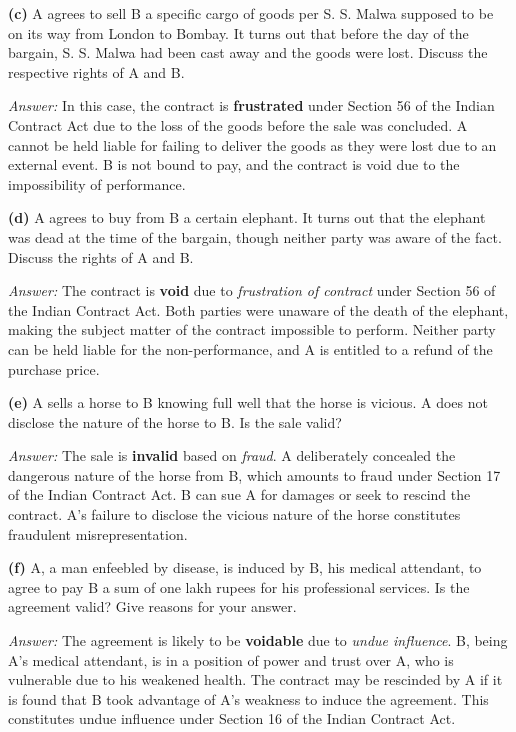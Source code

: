 \documentclass[12pt,a4paper]{book}
\begin{document}
\textbf{(c)} A agrees to sell B a specific cargo of goods per S. S. Malwa supposed to be on its way from London to Bombay. It turns out that before the day of the bargain, S. S. Malwa had been cast away and the goods were lost. Discuss the respective rights of A and B. 

\textit{Answer:}  
In this case, the contract is \textbf{frustrated} under Section 56 of the Indian Contract Act due to the loss of the goods before the sale was concluded. A cannot be held liable for failing to deliver the goods as they were lost due to an external event. B is not bound to pay, and the contract is void due to the impossibility of performance.

\vspace{1cm}

\textbf{(d)} A agrees to buy from B a certain elephant. It turns out that the elephant was dead at the time of the bargain, though neither party was aware of the fact. Discuss the rights of A and B. 

\textit{Answer:}  
The contract is \textbf{void} due to \textit{frustration of contract} under Section 56 of the Indian Contract Act. Both parties were unaware of the death of the elephant, making the subject matter of the contract impossible to perform. Neither party can be held liable for the non-performance, and A is entitled to a refund of the purchase price.  

\vspace{0.5cm}
\textbf{(e)} A sells a horse to B knowing full well that the horse is vicious. A does not disclose the nature of the horse to B. Is the sale valid? 

\textit{Answer:}  
The sale is \textbf{invalid} based on \textit{fraud}. A deliberately concealed the dangerous nature of the horse from B, which amounts to fraud under Section 17 of the Indian Contract Act. B can sue A for damages or seek to rescind the contract. A's failure to disclose the vicious nature of the horse constitutes fraudulent misrepresentation.

\vspace{0.5cm}
\textbf{(f)} A, a man enfeebled by disease, is induced by B, his medical attendant, to agree to pay B a sum of one lakh rupees for his professional services. Is the agreement valid? Give reasons for your answer.

\textit{Answer:}  
The agreement is likely to be \textbf{voidable} due to \textit{undue influence}. B, being A's medical attendant, is in a position of power and trust over A, who is vulnerable due to his weakened health. The contract may be rescinded by A if it is found that B took advantage of A's weakness to induce the agreement. This constitutes undue influence under Section 16 of the Indian Contract Act.
\end{document}
